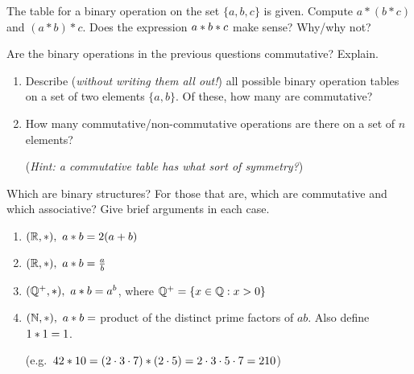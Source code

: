 \begin{exercises}
\begin{enumerate}
	
		\begin{minipage}[t]{0.72\linewidth}\vspace{0pt}
			\item The table for a binary operation on the set $\{a,b,c\}$ is given. Compute $a*(b*c)$ and $(a*b)*c$. Does the expression $a\mathbin{\ast} b\mathbin{\ast} c$ make sense? Why/why not?
			\end{minipage}
			\hfill
			\begin{minipage}[t]{0.2\linewidth}\vspace{0pt}
				\flushright{}
		\end{minipage}
		\par
	
	
		\item Are the binary operations in the previous questions commutative? Explain.
	
	
		\item\begin{enumerate}
		  \item Describe (\emph{without writing them all out!}) all possible binary operation tables on a set of two elements $\{a,b\}$. Of these, how many are commutative?
		  
		  \item How many commutative/non-commutative operations are there on a set of \emph{$n$} elements?\par
		  (\emph{Hint: a commutative table has what sort of symmetry?})
		\end{enumerate}
		
		
		\goodbreak
		
	  
	  \item Which are binary structures? For those that are, which are commutative and which associative? Give brief arguments in each case.
	  \begin{enumerate}%
	    \item {} 
	    	$(\mathbb{R},*),\ a\mathbin{\ast} b=2(a+b)$
	    	\setcounter{enumii}{2}
	    \item {} 
	    	$(\mathbb{R},*),\ a\mathbin{\ast} b=\frac ab$
	    	\setcounter{enumii}{4}
	    \item {}
	    	$(\mathbb{Q}^+,*),\ a\mathbin{\ast}  b=a^b$,  where $\mathbb{Q}^+=\{x\in\mathbb{Q}:x>0\}$
	    	\setcounter{enumii}{6}
	    \item $(\mathbb{N},*),\ a\mathbin{\ast} b=$ product of the distinct prime factors of $ab$. Also define $1\mathbin{\ast} 1=1$.\par
	    (e.g.~$42\mathbin{\ast} 10=(2\cdot 3\cdot 7)\mathbin{\ast} (2\cdot 5)=2\cdot 3\cdot 5\cdot 7=210$) 
	  \end{enumerate}
	  

\end{enumerate}
\end{exercises}
